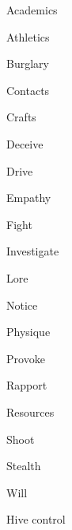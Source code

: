 \begin{npcBox}[title=Chris a Norm adventure therapist]

    \begin{aspects}
    \item {}
    \item {}
    \item {}
    \end{aspects}
    
    \begin{skills}
        \item {} Academics
        \item {} Athletics
        \item {} Burglary
        \item {} Contacts
        \item {} Crafts
        \item {} Deceive
        \item {} Drive
        \item {} Empathy
        \item {} Fight
        \item {} Investigate
        \item {} Lore
        \item {} Notice
        \item {} Physique
        \item {} Provoke
        \item {} Rapport
        \item {} Resources
        \item {} Shoot
        \item {} Stealth
        \item {} Will
        \item {} Hive control
     \end{skills}
    
    \begin{stunts}
    \item {}
    \end{stunts}
    

\end{npcBox}
